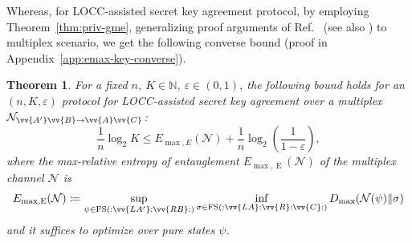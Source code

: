\documentclass[aps,pra,twocolumn,superscriptaddress,longbibliography]{revtex4-1}
\def\FS{\operatorname{FS}}
\def\E{\operatorname{E}}
\newcommand{\mc}[1]{\mathcal{#1}}
\newtheorem{theorem}{Theorem}
\begin{document}
Whereas, for LOCC-assisted secret key agreement protocol, by employing Theorem~\ref{thm:priv-gme}, generalizing proof arguments of Ref.~\cite[Theorem~2]{DBW17} (see also \cite{CM17}) to multiplex scenario, we get the following converse bound (proof in Appendix~\ref{app:emax-key-converse}). %
\begin{theorem}\label{thm:emax-key-converse} For a fixed $n,\ K\in\mathbb{N},\ \varepsilon\in(0,1)$, the following bound holds for an $(n,K,\varepsilon)$ protocol for LOCC-assisted secret key agreement over a multiplex $\mc{N}_{\vv{A'}\vv{B}\to\vv{A}\vv{C}}$: 
\begin{equation}\label{eq:emax-key-converse} 
\frac{1}{n}\log_2K\leq E_{\max,E}(\mc{N})+ \frac{1}{n}\log_2\left(\frac{1}{1-\varepsilon}\right), 
\end{equation} 
where the max-relative entropy of entanglement $E_{\max,\E}(\mc{N})$ of the multiplex channel $\mc{N}$ is 
\begin{equation*} 
E_{\max,\E}(\mc{N}) \coloneqq \sup_{\psi\in\FS(:\vv{LA'}:\vv{RB}:)}\inf_{\sigma\in\FS(:\vv{LA}:\vv{R}:\vv{C}:)} D_{\max}(\mc{N}(\psi)\Vert\sigma)
\end{equation*} 
and it suffices to optimize over pure states $\psi$.
\end{theorem}
\iffalse
\end{document}
